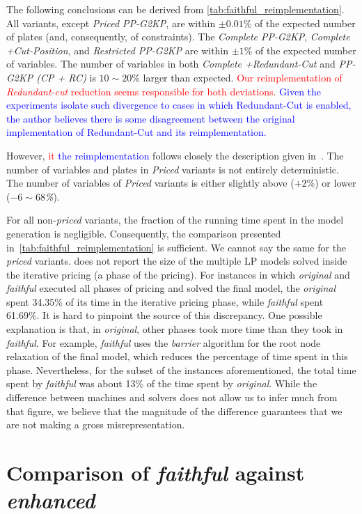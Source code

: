 \documentclass[ppgc,tese,english,formais,babel]{iiufrgs}
\newif\iffinalversion
\newcommand{\newtext}[1]{\iffinalversion%
#1%
\else%
\textcolor{blue}{#1}%
\fi%
}
\newcommand{\oldtext}[1]{\iffinalversion%
\else%
\textcolor{red}{#1}%
\fi%
}
\begin{document}
The following conclusions can be derived from \cref{tab:faithful_reimplementation}.
All variants, except \emph{Priced PP-G2KP}, are within \(\pm0.01\)\% of the expected number of plates (and, consequently, of constraints).
The \emph{Complete PP-G2KP}, \emph{Complete +Cut-Position}, and \emph{Restricted PP-G2KP} are within \(\pm1\)\% of the expected number of variables.
The number of variables in both \emph{Complete +Redundant-Cut} and \emph{PP-G2KP (CP + RC)} is \(10\sim20\)\% larger than expected.
\oldtext{Our reimplementation of \emph{Redundant-cut} reduction seems responsible for both deviations.}\newtext{Given the experiments isolate such divergence to cases in which Redundant-Cut is enabled, the author believes there is some disagreement between the original implementation of Redundant-Cut and its reimplementation.}
However, \oldtext{it}\newtext{the reimplementation} follows closely the description given in~\citet{dimitri_thesis}.
The number of variables and plates in \emph{Priced} variants is not entirely deterministic.
The number of variables of \emph{Priced} variants is either slightly above (\(+2\)\%) or lower (\emph{\(-6\sim68\)\%}).

For all non-\emph{priced} variants, the fraction of the running time spent in the model generation is negligible.
Consequently, the comparison presented in~\cref{tab:faithful_reimplementation} is sufficient.
We cannot say the same for the \emph{priced} variants.
\citet{dimitri_thesis} does not report the size of the multiple LP models solved inside the iterative pricing (a phase of the pricing).
For instances in which \emph{original} and \emph{faithful} executed all phases of pricing and solved the final model, the \emph{original} spent 34.35\% of its time in the iterative pricing phase, while \emph{faithful} spent 61.69\%.
It is hard to pinpoint the source of this discrepancy.
One possible explanation is that, in \emph{original}, other phases took more time than they took in \emph{faithful}.
For example, \emph{faithful} uses the \emph{barrier} algorithm for the root node relaxation of the final model, which reduces the percentage of time spent in this phase.
Nevertheless, for the subset of the instances aforementioned, the total time spent by \emph{faithful} was about 13\% of the time spent by \emph{original}.
While the difference between machines and solvers does not allow us to infer much from that figure, we believe that the magnitude of the difference guarantees that we are not making a gross misrepresentation.

\section{Comparison of \emph{faithful} against \emph{enhanced}}
\label{sec:comparison}
\end{document}
